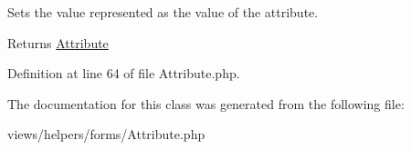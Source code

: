 Sets the value represented as the value of the attribute. 

\begin{DoxyReturn}{Returns}
\hyperlink{class_attribute}{Attribute} 
\end{DoxyReturn}


Definition at line 64 of file Attribute.php.



The documentation for this class was generated from the following file:\begin{DoxyCompactItemize}
\item 
views/helpers/forms/Attribute.php\end{DoxyCompactItemize}
